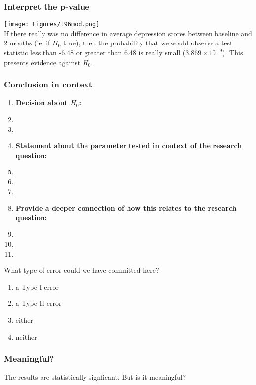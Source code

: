 \begin{frame}
\frametitle{Interpret the p-value}
\texttt{[image: Figures/t96mod.png]}\\
If there really was no difference in average depression scores between baseline and 2 months (ie, if $H_0$ true), then the probability that we would observe a test statistic less than -6.48 or greater than 6.48 is really small ($3.869 \times 10^{-9}$).  This presents evidence against $H_0$.
\end{frame}

\begin{frame}
\frametitle{Conclusion in context}
\begin{enumerate}
    \item \textbf{Decision about $H_0$:}
    \item[]
    \item[]
    \item \textbf{Statement about the parameter tested in context of the research question:}
    \item[]
    \item[]
    \item[]
    \item \textbf{Provide a deeper connection of how this relates to the research question:}
    \item[]
    \item[]
    \item[]
\end{enumerate}
\end{frame}

\begin{frame}
\begin{clicker}
{What type of error could we have committed here?}
\begin{enumerate}
   \item
   a Type I error
   \item
   a Type II error
   \item
   either
   \item
   neither
\end{enumerate}
\end{clicker}
\end{frame}

\begin{frame}[fragile]
\frametitle{Meaningful?}
The results are statistically signficant.  But is it meaningful?
\vskip200pt
\end{frame}

